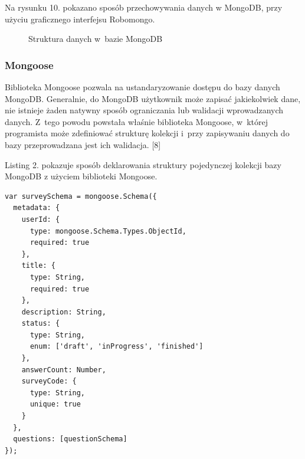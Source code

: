 \documentclass[12pt,a4paper,notitlepage]{article}
\begin{document}
\par Na rysunku 10. pokazano sposób przechowywania danych w MongoDB, przy użyciu graficznego interfejsu Robomongo.

\begin{figure}[H]
\begin{center}
\caption{Struktura danych w~bazie MongoDB}
\end{center}
\end{figure}

\subsubsection{Mongoose}
Biblioteka Mongoose pozwala na ustandaryzowanie dostępu do bazy danych MongoDB. Generalnie, do MongoDB użytkownik może zapisać jakiekolwiek dane, nie istnieje żaden natywny sposób ograniczania lub walidacji wprowadzanych danych. Z~tego powodu powstała właśnie biblioteka Mongoose, w~której programista może zdefiniować strukturę kolekcji i~przy zapisywaniu danych do bazy przeprowadzana jest ich walidacja. [8]
\par Listing 2. pokazuje sposób deklarowania struktury pojedynczej kolekcji bazy MongoDB z użyciem biblioteki Mongoose.

\begin{lstlisting}[caption=Przykład definicji struktury kolekcji w~bibliotece Mongoose ]
var surveySchema = mongoose.Schema({
  metadata: {
    userId: {
      type: mongoose.Schema.Types.ObjectId,
      required: true
    },
    title: {
      type: String,
      required: true
    },
    description: String,
    status: {
      type: String,
      enum: ['draft', 'inProgress', 'finished']
    },
    answerCount: Number,
    surveyCode: {
      type: String,
      unique: true
    }
  },
  questions: [questionSchema]
});
\end{lstlisting}
\end{document}
